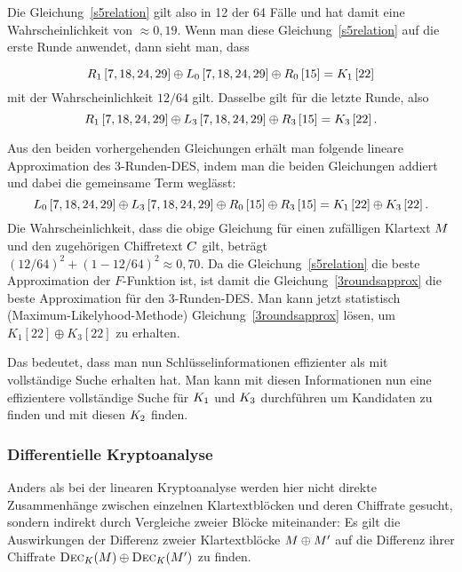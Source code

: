 Die Gleichung~\ref{s5relation} gilt also in 12 der 64 Fälle und hat damit eine Wahrscheinlichkeit von $\approx 0,19$. Wenn man diese Gleichung~\ref{s5relation}
auf die erste Runde anwendet, dann sieht man, dass

\begin{equation}
  R_1\left[ 7,18,24,29\right] \oplus L_0\left[ 7,18,24,29\right] \oplus R_0\left[ 15 \right] = K_1 \left[ 22 \right]
\end{equation}
mit der Wahrscheinlichkeit $12/64$ gilt. Dasselbe gilt für die letzte Runde, also
\begin{equation}
  R_1\left[ 7,18,24,29\right] \oplus L_3\left[ 7,18,24,29\right] \oplus R_3\left[ 15 \right] = K_3 \left[ 22 \right].
\end{equation}

Aus den beiden vorhergehenden Gleichungen erhält man folgende lineare Approximation des 3-Runden-DES, indem man die beiden Gleichungen addiert und dabei die
gemeinsame Term weglässt:
\begin{equation}
  L_0\left[ 7,18,24,29\right] \oplus L_3\left[ 7,18,24,29\right] \oplus R_0\left[ 15 \right] \oplus R_3\left[ 15 \right] = K_1 \left[ 22 \right] \oplus K_3\left[ 22 \right].
  \label{3roundsapprox}
\end{equation}
Die Wahrscheinlichkeit, dass die obige Gleichung für einen zufälligen Klartext $M$ und den zugehörigen Chiffretext $C$ gilt, beträgt
$(12/64)^2+(1-12/64)^2 \approx 0,70$. Da die Gleichung~\ref{s5relation} die beste Approximation der $F$-Funktion ist, ist damit die
Gleichung~\ref{3roundsapprox} die beste Approximation für den 3-Runden-DES. Man kann jetzt statistisch (Maximum-Likelyhood-Methode)
Gleichung~\ref{3roundsapprox} lösen, um $K_1\left[ 22\right] \oplus K_3\left[ 22\right]$ zu erhalten.

Das bedeutet, dass man nun Schlüsselinformationen effizienter als mit vollständige Suche erhalten hat. Man kann mit diesen Informationen nun eine effizientere
vollständige Suche für $K_1$ und $K_3$ durchführen um Kandidaten zu finden und mit diesen $K_2$ finden.


\subsubsection{Differentielle Kryptoanalyse}
Anders als bei der linearen Kryptoanalyse werden hier nicht direkte Zusammenhänge zwischen einzelnen Klartextblöcken und deren Chiffrate gesucht, sondern
indirekt durch Vergleiche zweier Blöcke miteinander: Es gilt die Auswirkungen der Differenz zweier Klartextblöcke $M \oplus M'$ auf die Differenz
ihrer Chiffrate $\textsc{Dec}_{K}(M) \oplus \textsc{Dec}_{K}(M')$ zu finden.

